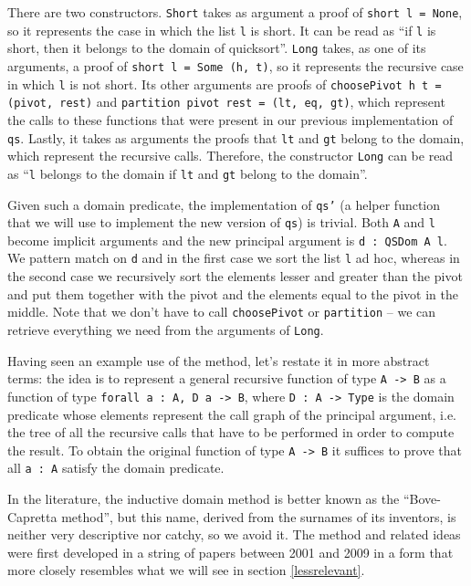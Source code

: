 \documentclass[declaration,mgr,english,shortabstract]{iithesis}
\newcommand{\m}[1]{\texttt{#1}}
\begin{document}
There are two constructors. \m{Short} takes as argument a proof of \m{short l = None}, so it represents the case in which the list \m{l} is short. It can be read as ``if \m{l} is short, then it belongs to the domain of quicksort''. \m{Long} takes, as one of its arguments, a proof of \m{short l = Some (h, t)}, so it represents the recursive case in which \m{l} is not short. Its other arguments are proofs of \m{choosePivot h t = (pivot, rest)} and \m{partition pivot rest = (lt, eq, gt)}, which represent the calls to these functions that were present in our previous implementation of \m{qs}. Lastly, it takes as arguments the proofs that \m{lt} and \m{gt} belong to the domain, which represent the recursive calls. Therefore, the constructor \m{Long} can be read as ``\m{l} belongs to the domain if \m{lt} and \m{gt} belong to the domain''.

Given such a domain predicate, the implementation of \m{qs'} (a helper function that we will use to implement the new version of \m{qs}) is trivial. Both \m{A} and \m{l} become implicit arguments and the new principal argument is \m{d\ :\ QSDom A l}. We pattern match on \m{d} and in the first case we sort the list \m{l} ad hoc, whereas in the second case we recursively sort the elements lesser and greater than the pivot and put them together with the pivot and the elements equal to the pivot in the middle. Note that we don't have to call \m{choosePivot} or \m{partition} -- we can retrieve everything we need from the arguments of \m{Long}.

Having seen an example use of the method, let's restate it in more abstract terms: the idea is to represent a general recursive function of type \m{A -> B} as a function of type \m{forall a\ :\ A, D a -> B}, where \m{D\ :\ A -> Type} is the domain predicate whose elements represent the call graph of the principal argument, i.e. the tree of all the recursive calls that have to be performed in order to compute the result. To obtain the original function of type \m{A -> B} it suffices to prove that all \m{a\ :\ A} satisfy the domain predicate.

In the literature, the inductive domain method is better known as the ``Bove-Capretta method'', but this name, derived from the surnames of its inventors, is neither very descriptive nor catchy, so we avoid it. The method and related ideas were first developed in a string of papers between 2001 and 2009 \cite{BCM1} \cite{BCM2} \cite{BCM3} \cite{BCM4} \cite{BCM5} \cite{BCM6} \cite{BCM7} \cite{BCM8} \cite{BCM9} in a form that more closely resembles what we will see in section \ref{lessrelevant}.
\end{document}

